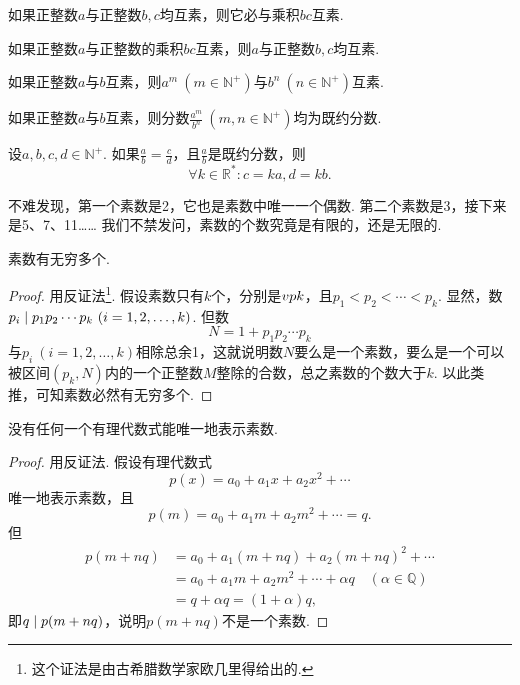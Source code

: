 \begin{theorem}
如果正整数\(a\)与正整数\(b,c\)均互素，则它必与乘积\(bc\)互素.
\end{theorem}
\begin{corollary}
如果正整数\(a\)与正整数的乘积\(bc\)互素，则\(a\)与正整数\(b,c\)均互素.
\end{corollary}
\begin{corollary}
如果正整数\(a\)与\(b\)互素，则\(a^m\ (m\in\mathbb{N}^+)\)与\(b^n\ (n\in\mathbb{N}^+)\)互素.
\end{corollary}

\begin{theorem}
如果正整数\(a\)与\(b\)互素，则分数\(\frac{a^m}{b^n}\ (m,n\in\mathbb{N}^+)\)均为既约分数.
\end{theorem}
\begin{corollary}
设\(a,b,c,d\in\mathbb{N}^+\).
如果\(\frac{a}{b} = \frac{c}{d}\)，且\(\frac{a}{b}\)是既约分数，则\[
\forall k\in\mathbb{R}^* : c = ka, d = kb.
\]
\end{corollary}

不难发现，第一个素数是2，它也是素数中唯一一个偶数.
第二个素数是3，接下来是5、7、11……
我们不禁发问，素数的个数究竟是有限的，还是无限的.
\begin{theorem}
素数有无穷多个.
\begin{proof}
用反证法\footnote{这个证法是由古希腊数学家欧几里得给出的.}.
假设素数只有\(k\)个，分别是\(\v{p}{k}\)，且\(p_1 < p_2 < \dotsb < p_k\).
显然，数\(\truediv{p_1 p_2 \dotsm p_k}{p_i}\ (i=1,2,\dotsc,k)\).
但数\[
N = 1 + p_1 p_2 \dotsm p_k
\]与\(p_i\ (i=1,2,\dotsc,k)\)相除总余1，这就说明数\(N\)要么是一个素数，要么是一个可以被区间\((p_k,N)\)内的一个正整数\(M\)整除的合数，总之素数的个数大于\(k\).
以此类推，可知素数必然有无穷多个.
\end{proof}
\end{theorem}

\begin{theorem}
没有任何一个有理代数式能唯一地表示素数.
\begin{proof}
用反证法.
假设有理代数式\[
p(x) = a_0 + a_1 x + a_2 x^2 + \dotsb
\]唯一地表示素数，且\[
p(m) = a_0 + a_1 m + a_2 m^2 + \dotsb = q.
\]但\begin{align*}
p(m+nq) &= a_0 + a_1 (m+nq) + a_2 (m+nq)^2 + \dotsb \\
&= a_0 + a_1 m + a_2 m^2 + \dotsb + \alpha q \quad(\alpha\in\mathbb{Q}) \\
&= q + \alpha q = (1+\alpha)q,
\end{align*}即\(\truediv{p(m+nq)}{q}\)，说明\(p(m+nq)\)不是一个素数.
\end{proof}
\end{theorem}


